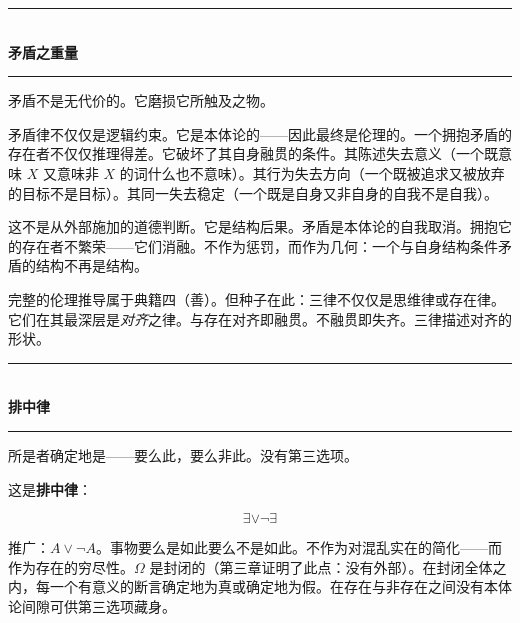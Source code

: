 \documentclass[10pt, openany, oneside]{book}
\renewcommand{\normalsize}{\fontsize{10}{13}\selectfont}
\begin{document}
\begin{center}
    \rule{0.3\textwidth}{0.4pt}\\[0.5em]
    {\normalsize\bfseries\scshape 矛盾之重量}\\[0.3em]
    \rule{0.3\textwidth}{0.4pt}
\end{center}

\vspace{1em}

\noindent 矛盾不是无代价的。它磨损它所触及之物。

矛盾律不仅仅是逻辑约束。它是本体论的——因此最终是伦理的。一个拥抱矛盾的存在者不仅仅推理得差。它破坏了其自身融贯的条件。其陈述失去意义（一个既意味 $X$ 又意味非 $X$ 的词什么也不意味）。其行为失去方向（一个既被追求又被放弃的目标不是目标）。其同一失去稳定（一个既是自身又非自身的自我不是自我）。

这不是从外部施加的道德判断。它是结构后果。矛盾是本体论的自我取消。拥抱它的存在者不繁荣——它们消融。不作为惩罚，而作为几何：一个与自身结构条件矛盾的结构不再是结构。

完整的伦理推导属于典籍四（善）。但种子在此：三律不仅仅是思维律或存在律。它们在其最深层是\textit{对齐}之律。与存在对齐即融贯。不融贯即失齐。三律描述对齐的形状。

\vspace{1.5em}


\begin{center}
    \rule{0.3\textwidth}{0.4pt}\\[0.5em]
    {\normalsize\bfseries\scshape 排中律}\\[0.3em]
    \rule{0.3\textwidth}{0.4pt}
\end{center}

\vspace{1em}

\noindent 所是者确定地是——要么此，要么非此。没有第三选项。

这是\textbf{排中律}：

$$\exists \vee \neg\exists$$

推广：$A \vee \neg A$。事物要么是如此要么不是如此。不作为对混乱实在的简化——而作为存在的穷尽性。$\Omega$ 是封闭的（第三章证明了此点：没有外部）。在封闭全体之内，每一个有意义的断言确定地为真或确定地为假。在存在与非存在之间没有本体论间隙可供第三选项藏身。

\vspace{0.5em}
\end{document}
